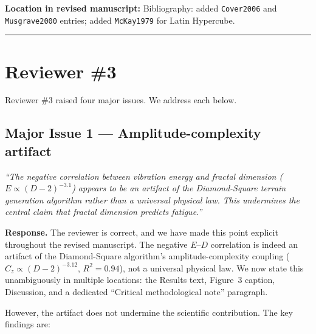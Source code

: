 \documentclass[11pt]{article}
\newcommand{\revquote}[1]{\medskip\noindent\textit{``#1''}\medskip}
\newcommand{\revloc}[1]{\noindent\textbf{Location in revised manuscript:} #1\medskip}
\begin{document}
\revloc{Bibliography: added \texttt{Cover2006} and \texttt{Musgrave2000} entries; added \texttt{McKay1979} for Latin Hypercube.}


\bigskip\noindent\rule{\textwidth}{0.4pt}

\section*{Reviewer \#3}

\noindent Reviewer \#3 raised four major issues. We address each below.

\bigskip

\subsection*{Major Issue 1 --- Amplitude-complexity artifact}

\revquote{The negative correlation between vibration energy and fractal dimension ($E \propto (D-2)^{-3.1}$) appears to be an artifact of the Diamond-Square terrain generation algorithm rather than a universal physical law. This undermines the central claim that fractal dimension predicts fatigue.}

\noindent\textbf{Response.} The reviewer is correct, and we have made this point explicit throughout the revised manuscript. The negative $E$--$D$ correlation is indeed an artifact of the Diamond-Square algorithm's amplitude-complexity coupling ($C_z \propto (D-2)^{-3.12}$, $R^2 = 0.94$), not a universal physical law. We now state this unambiguously in multiple locations: the Results text, Figure~3 caption, Discussion, and a dedicated ``Critical methodological note'' paragraph.

However, the artifact does not undermine the scientific contribution. The key findings are:
\end{document}
